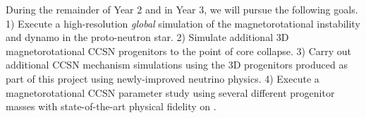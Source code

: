 \documentclass[12pt,letterpaper]{article}
\begin{document}
\begin{flushleft}
{During the remainder of Year 2 and in Year 3, we will pursue the following goals.
1) Execute a high-resolution {\it global} simulation of the magnetorotational instability and dynamo in the proto-neutron star. 
2) Simulate additional 3D magnetorotational CCSN progenitors to the point of core collapse.
3) Carry out additional CCSN mechanism simulations using the 3D progenitors produced as part of this project using newly-improved neutrino physics.
4) Execute a magnetorotational CCSN parameter study using several different progenitor masses with state-of-the-art physical fidelity on \thet.

}
\end{flushleft}
\end{document}
